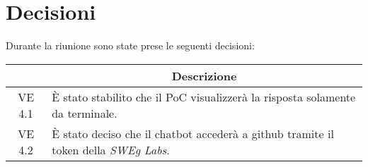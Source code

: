 

\section{Decisioni}

Durante la riunione sono state prese le seguenti decisioni:

\vspace{0.5cm}

\begin{table}[htbp]
    \centering
    \begin{tabular}{|c|p{}|}
        \hline
        \rowcolor[gray]{0.75}
        \multicolumn{1}{|c|}{\textbf{Codice}} & \multicolumn{1}{|c|}{\textbf{Descrizione}}\\
        \hline
        VE 4.1 & È stato stabilito che il PoC visualizzerà la risposta solamente da terminale. \\
        \hline
        VE 4.2 & È stato deciso che il chatbot accederà a github tramite il token della \emph{SWEg Labs}. \\
        \hline
    \end{tabular}
    \end{table}
